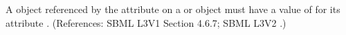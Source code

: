A \Parameter object referenced by the attribute  on
a \Species or \Model object must have a value of  for its
attribute .  (References: SBML L3V1 Section 4.6.7; SBML L3V2
.)

